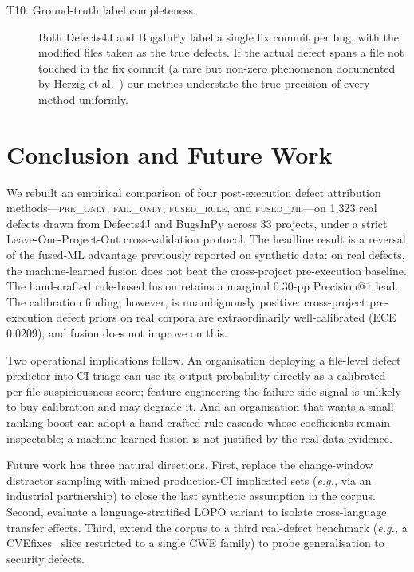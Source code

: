 \documentclass[preprint,12pt]{elsarticle}
\begin{document}
\begin{description}
\item[T10: Ground-truth label completeness.] Both Defects4J and BugsInPy label a single fix commit per bug, with the modified files taken as the true defects. If the actual defect spans a file not touched in the fix commit (a rare but non-zero phenomenon documented by Herzig et al.~\cite{herzig2013}) our metrics understate the true precision of every method uniformly.
\end{description}

\section{Conclusion and Future Work}
\label{sec:conclusion}

We rebuilt an empirical comparison of four post-execution defect attribution methods---\textsc{pre\_only}, \textsc{fail\_only}, \textsc{fused\_rule}, and \textsc{fused\_ml}---on 1{,}323 real defects drawn from Defects4J and BugsInPy across 33 projects, under a strict Leave-One-Project-Out cross-validation protocol. The headline result is a reversal of the fused-ML advantage previously reported on synthetic data: on real defects, the machine-learned fusion does not beat the cross-project pre-execution baseline. The hand-crafted rule-based fusion retains a marginal 0.30-pp Precision@1 lead. The calibration finding, however, is unambiguously positive: cross-project pre-execution defect priors on real corpora are extraordinarily well-calibrated (ECE 0.0209), and fusion does not improve on this.

Two operational implications follow. An organisation deploying a file-level defect predictor into CI triage can use its output probability directly as a calibrated per-file suspiciousness score; feature engineering the failure-side signal is unlikely to buy calibration and may degrade it. And an organisation that wants a small ranking boost can adopt a hand-crafted rule cascade whose coefficients remain inspectable; a machine-learned fusion is not justified by the real-data evidence.

Future work has three natural directions. First, replace the change-window distractor sampling with mined production-CI implicated sets (\emph{e.g.,} via an industrial partnership) to close the last synthetic assumption in the corpus. Second, evaluate a language-stratified LOPO variant to isolate cross-language transfer effects. Third, extend the corpus to a third real-defect benchmark (\emph{e.g.,} a CVEfixes~\cite{sliwerski2005} slice restricted to a single CWE family) to probe generalisation to security defects.
\end{document}
